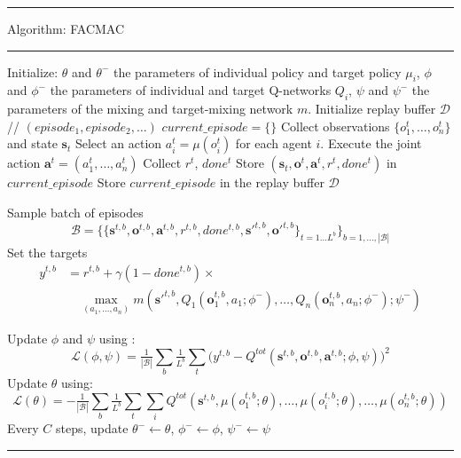 \documentclass[varwidth, border=20pt]{standalone}
\begin{document}
\begingroup
\small                    
\begin{center}
  \begin{minipage}{0.99\linewidth} 
    \hrule height 0.7pt
    \vspace{3pt}
    Algorithm: FACMAC
    \vspace{3pt}
    \hrule height 0.7pt
    \vspace{6pt}

   
    \begin{algorithmic}[1]
      \State Initialize: $\theta$ and  $\theta^-$ the parameters of individual policy and target policy $\mu_i$, $\phi$ and  $\phi^-$ the parameters of individual and target Q-networks $Q_i$, $\psi$ and $\psi^-$ the parameters of the mixing and target-mixing network $m$.
      \State Initialize replay buffer $\mathcal{D}$ // $(episode_1, episode_2, \dots)$
        \State $current\_episode = \{ \}$ 
        \State Collect observations $\{o^t_1,\dots,o^t_n\}$ and state $\mathbf{s}_t$
        \State Select an action $a^t_i = \mu(o^t_i)$ for each agent $i$. 
         \State Execute the joint action $\mathbf{a}^t = (a_1^t,\dots,a_n^t)$
         \State Collect $r^t$, $done^t$
         \State Store $(\mathbf{s}_t,\mathbf{o}^t,\mathbf{a}^t,r^t,done^t)$ in $current\_episode$
        \EndWhile
        \State Store $current\_episode$ in the replay buffer $\mathcal{D}$
        
          \State Sample batch of episodes 
          \[ 
            \mathcal{B} = \{ \{\mathbf{s}^{t,b},\mathbf{o}^{t,b},\mathbf{a}^{t,b},r^{t,b},done^{t,b},\mathbf{s'}^{t,b},\mathbf{o'}^{t,b}\}_{t=1 ... L^b}\}_{b=1, ..., |\mathcal{B}|}\]
          \State Set the targets 
          \Statex
          \begin{align*}
            y^{t,b} &= r^{t,b} + \gamma (1 - done^{t,b}) \times \\
            &\quad \max_{(a_1, \dots, a_n)} m(\mathbf{s'}^{t,b}, Q_1(\mathbf{o}_1^{t,b}, a_1;\phi^-), \dots, Q_n(\mathbf{o}_n^{t,b}, a_n;\phi^-); \psi^-)
            \end{align*}
            
          \State Update $\phi$ and $\psi$ using :
          \Statex
          \[
            \mathcal{L}(\phi,\psi)=\tfrac{1}{|\mathcal{B}|}\sum_b \tfrac{1}{L^b} \sum_t \Big(y^{t,b}- Q^{tot}(\mathbf{s}^{t,b},\mathbf{o}^{t,b},\mathbf{a}^{t,b};\phi, \psi)\Big)^2
          \]
          \State Update $\theta$ using: 
          \[
            \mathcal{L}(\theta) = - \tfrac{1}{|\mathcal{B}|}\sum_b \tfrac{1}{L^b} \sum_t \sum_i Q^{tot}(\mathbf{s}^{t,b},\mu(o^{t,b}_1;\theta), \dots, \mu(o^{t,b}_i;\theta), \dots , \mu(o^{t,b}_n;\theta))
          \]
          \State Every $C$ steps, update $\theta^- \leftarrow \theta$, $\phi^- \leftarrow \phi$, $\psi^- \leftarrow \psi$ 
        \EndIf
      \EndWhile
    \end{algorithmic}

    \vspace{6pt}
    \hrule height 0.7pt
  \end{minipage}
\end{center}
\endgroup
\end{document}
